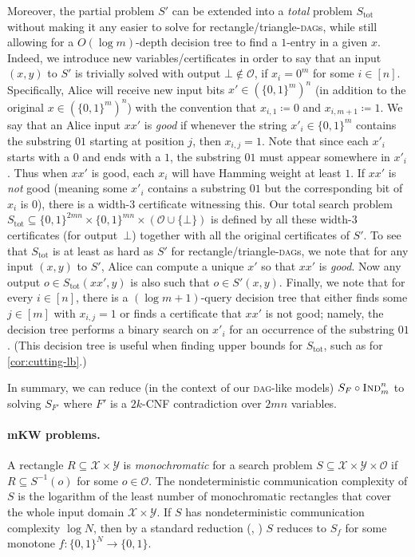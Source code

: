 \documentclass{toc}
\newcommand{\Ind}{\textsc{Ind}}
\newcommand{\DAG}{\textsc{dag}}
\newcommand{\DAGs}{\textsc{dag}s\xspace}
\newcommand{\calO}{\mathcal{O}}
\newcommand{\calX}{\mathcal{X}}
\newcommand{\calY}{\mathcal{Y}}
\begin{document}
Moreover, the partial problem $S'$ can be extended into a \emph{total} problem $S_{\text{tot}}$ without making it any easier to solve for rectangle/triangle-\DAGs, while still allowing for a $O(\log m)$-depth decision tree to find a $1$-entry in a given $x$. Indeed, we introduce new variables/certificates in order to say that an input $(x,y)$ to $S'$ is trivially solved with output $\bot\notin \calO$, if $x_i=0^m$ for some $i\in[n]$. Specifically, Alice will receive new input bits $x'\in(\{0,1\}^m)^n$ (in addition to the original $x\in(\{0,1\}^m)^n$) with the convention that $x_{i,1}\coloneqq 0$ and $x_{i,m+1}\coloneqq 1$. We say that an Alice input $xx'$ is \emph{good} if whenever the string $x'_i\in\{0,1\}^m$ contains the substring $01$ starting at position $j$, then $x_{i,j}=1$. Note that since each $x'_i$ starts with a $0$ and ends with a $1$, the substring $01$ must appear somewhere in $x'_i$. Thus when $xx'$ is good, each $x_i$ will have Hamming weight at least $1$. If $xx'$ is \emph{not} good (meaning some $x'_i$ contains a substring $01$ but the corresponding bit of $x_i$ is $0$), there is a width-$3$ certificate witnessing this. Our total search problem $S_\text{tot}\subseteq \{0,1\}^{2mn}\times \{0,1\}^{mn}\times(\calO\cup\{\bot\})$ is defined by all these width-$3$ certificates (for output~$\bot$) together with all the original certificates of $S'$. To see that $S_{\text{tot}}$ is at least as hard as $S'$ for rectangle/triangle-\DAGs, we note that for any input $(x,y)$ to $S'$, Alice can compute a unique $x'$ so that $xx'$ is \emph{good}. Now any output $o\in S_{\text{tot}}(xx',y)$ is also such that $o\in S'(x,y)$. Finally, we note that for every $i\in[n]$, there is a $(\log m+1)$-query decision tree that either finds some $j\in[m]$ with $x_{i,j}=1$ or finds a certificate that $xx'$ is not good; namely, the decision tree performs a binary search on $x'_i$ for an occurrence of the substring $01$. (This decision tree is useful when finding upper bounds for $S_\text{tot}$, such as for \autoref{cor:cutting-lb}.)

In summary, we can reduce (in the context of our \DAG-like models) $S_F\circ \Ind_m^n$ to solving $S_{F'}$ where $F'$ is a $2k$-CNF contradiction over $2mn$ variables.



\paragraph{mKW problems.}
A rectangle $R \subseteq\calX\times\calY$ is \emph{monochromatic} for a search problem $S\subseteq\calX\times\calY\times\calO$ if $R\subseteq S^{-1}(o)$ for some $o\in\calO$. The nondeterministic communication complexity of $S$ is the logarithm of the least number of monochromatic rectangles that cover the whole input domain $\calX\times\calY$. If $S$ has nondeterministic communication complexity $\log N$, then by a standard reduction (\eg, \cite[Lemma 2.3]{gal01characterization}) $S$ reduces to $S_f$ for some monotone $f\colon\{0,1\}^N\to\{0,1\}$.
\end{document}
